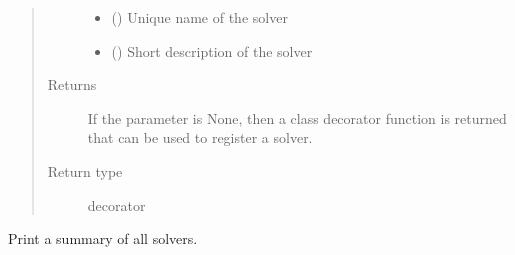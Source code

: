 \documentclass[letterpaper,10pt,english]{sphinxmanual}
\begin{document}
\begin{fulllineitems}
\begin{fulllineitems}
\begin{quote}
\begin{description}
\begin{itemize}
\item {} 
 () \textendash{} Unique name of the solver

\item {} 
 () \textendash{} Short description of the solver

\end{itemize}

\item[{Returns}] \leavevmode
If the  parameter is None, then a class
decorator function
is returned that can be used to register a solver.

\item[{Return type}] \leavevmode
decorator

\end{description}\end{quote}

\end{fulllineitems}


\begin{fulllineitems}
\label{\detokenize{reference/solverapi:pao.common.solver.SolverFactory.summary}}
Print a summary of all solvers.

\end{fulllineitems}


\end{fulllineitems}

\end{document}
